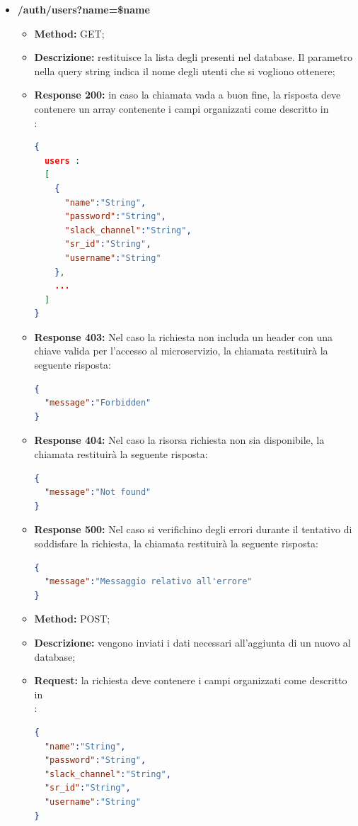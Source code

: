 \begin{itemize}
\item \textbf{/auth/users?name=\$name}\\
\begin{itemize}
\item \textbf{Method:} GET;
\item \textbf{Descrizione:} restituisce la lista degli  presenti nel database. Il parametro  nella query string indica il nome degli utenti che si vogliono ottenere;
\item \textbf{Response 200:} in caso la chiamata vada a buon fine, la risposta deve contenere un array contenente i campi organizzati come descritto in \\:
\begin{lstlisting}[language=json,firstnumber=1]
{
  users :
  [
    {
      "name":"String",
      "password":"String",
      "slack_channel":"String",
      "sr_id":"String",
      "username":"String"
    },
    ...
  ]
}
\end{lstlisting}
\item \textbf{Response 403:} Nel caso la richiesta non includa un header  con una chiave valida per l'accesso al microservizio, la chiamata restituirà la seguente risposta:
\begin{lstlisting}[language=json,firstnumber=1]
{
  "message":"Forbidden"
}
\end{lstlisting}
\item \textbf{Response 404:} Nel caso la risorsa richiesta non sia disponibile, la chiamata restituirà la seguente risposta:
\begin{lstlisting}[language=json,firstnumber=1]
{
  "message":"Not found"
}
\end{lstlisting}
\item \textbf{Response 500:} Nel caso si verifichino degli errori durante il tentativo di soddisfare la richiesta, la chiamata restituirà la seguente risposta:
\begin{lstlisting}[language=json,firstnumber=1]
{
  "message":"Messaggio relativo all'errore"
}
\end{lstlisting}
\end{itemize}

\begin{itemize}
\item \textbf{Method:} POST;
\item \textbf{Descrizione:} vengono inviati i dati necessari all'aggiunta di un nuovo  al database;
\item \textbf{Request:} la richiesta deve contenere i campi organizzati come descritto in\\ :
\begin{lstlisting}[language=json,firstnumber=1]
{
  "name":"String",
  "password":"String",
  "slack_channel":"String",
  "sr_id":"String",
  "username":"String"
}
\end{lstlisting}


\end{itemize}
\end{itemize}

